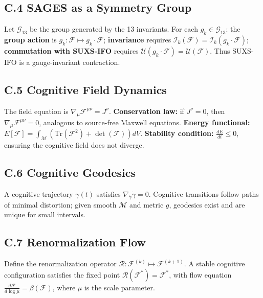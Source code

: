 \subsection{C.4 SAGES as a Symmetry Group}\label{c.4-sages-as-a-symmetry-group}

Let \(\mathcal{G}_{13}\) be the group generated by the 13 invariants. For each \(g_k \in \mathcal{G}_{13}\): the \textbf{group action} is \(g_k : \mathcal{F} \mapsto g_k \cdot \mathcal{F}\); \textbf{invariance} requires \(\mathcal{I}_k(\mathcal{F}) = \mathcal{I}_k(g_k \cdot \mathcal{F})\); \textbf{commutation with SUXS-IFO} requires \(\mathcal{U}(g_k \cdot \mathcal{F}) = \mathcal{U}(\mathcal{F})\). Thus SUXS-IFO is a gauge-invariant contraction.

\subsection{C.5 Cognitive Field Dynamics}\label{c.5-cognitive-field-dynamics}

The field equation is \(\nabla_{\mu} \mathcal{F}^{\mu\nu} = J^\nu\). \textbf{Conservation law:} if \(J^\nu = 0\), then \(\nabla_{\mu} \mathcal{F}^{\mu\nu} = 0\), analogous to source-free Maxwell equations. \textbf{Energy functional:} \(E[\mathcal{F}] = \int_{\mathcal{M}} \left( \mathrm{Tr}(\mathcal{F}^2) + \det(\mathcal{F}) \right) dV\). \textbf{Stability condition:} \(\frac{dE}{dt} \le 0\), ensuring the cognitive field does not diverge.

\subsection{C.6 Cognitive Geodesics}\label{c.6-cognitive-geodesics}

A cognitive trajectory \(\gamma(t)\) satisfies \(\nabla_{\dot{\gamma}} \dot{\gamma} = 0\). Cognitive transitions follow paths of minimal distortion; given smooth \(\mathcal{M}\) and metric \(g\), geodesics exist and are unique for small intervals.

\subsection{C.7 Renormalization Flow}\label{c.7-renormalization-flow}

Define the renormalization operator \(\mathcal{R} : \mathcal{F}^{(k)} \mapsto \mathcal{F}^{(k+1)}\). A stable cognitive configuration satisfies the fixed point \(\mathcal{R}(\mathcal{F}^\ast) = \mathcal{F}^\ast\), with flow equation \(\frac{d\mathcal{F}}{d\log \mu} = \beta(\mathcal{F})\), where \(\mu\) is the scale parameter.

